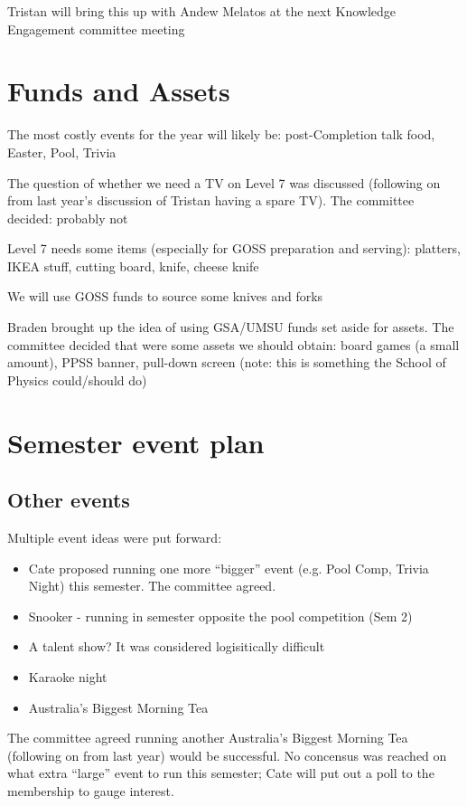 \documentclass[a4paper,11pt]{article}
\begin{document}
Tristan will bring this up with Andew Melatos at the next Knowledge Engagement committee meeting

\section{Funds and Assets}
The most costly events for the year will likely be: post-Completion talk food, Easter, Pool, Trivia

The question of whether we need a TV on Level 7 was discussed (following on from last year's discussion of Tristan having a spare TV). The committee decided: probably not

Level 7 needs some items (especially for GOSS preparation and serving): platters, IKEA stuff, cutting board, knife, cheese knife

We will use GOSS funds to source some knives and forks

Braden brought up the idea of using GSA/UMSU funds set aside for assets. The committee decided that were some assets we should obtain: board games (a small amount), PPSS banner, pull-down screen (note: this is something the School of Physics could/should do)

\section{Semester event plan}
\subsection{Other events}

Multiple event ideas were put forward:
\begin{itemize}
\item Cate proposed running one more ``bigger'' event (e.g. Pool Comp, Trivia Night) this semester. The committee agreed.

\item Snooker - running in semester opposite the pool competition (Sem 2)
	
\item A talent show? It was considered logisitically difficult
	
\item Karaoke night
	
\item Australia's Biggest Morning Tea
\end{itemize}

The committee agreed running another Australia's Biggest Morning Tea (following on from last year) would be successful. No concensus was reached on what extra ``large'' event to run this semester; Cate will put out a poll to the membership to gauge interest.
\end{document}
